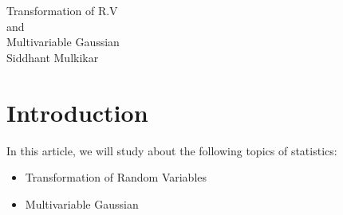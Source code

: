 \documentclass{article}
\begin{document}
\begin{center}
    \huge
    Transformation of R.V\\ and\\ Multivariable Gaussian\\
    \large
    \vspace{5mm} %
    Siddhant Mulkikar
\end{center}

\tableofcontents
\clearpage
\pagestyle{fancy}
\section{Introduction}
In this article, we will study about the following topics of statistics:
\begin{itemize}
    \item Transformation of Random Variables
    \item Multivariable Gaussian
\end{itemize}
\end{document}

